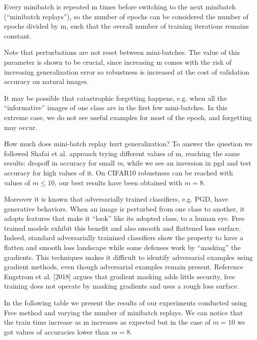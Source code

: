 \documentclass{article}
\begin{document}
Every minibatch is repeated m times before switching to the next minibatch (“minibatch replays”), so the number of epochs can be considered the number of epochs divided by m, such that the overall number of training iterations remains constant. 


Note that perturbations are not reset between mini-batches. The value of this parameter is shown to be crucial, since increasing m comes with the risk of increasing generalization error so robustness is increased at the cost of validation accuracy on natural images.

It may be possible that catastrophic forgetting happens, e.g. when all the “informative” images of one class are in the first few mini-batches. In this extreme case, we do not see useful examples for most of the epoch, and forgetting may occur.

 
How much does mini-batch replay hurt generalization?
To answer the question we followed Shafai et al. approach trying different values of m, reaching the same results: dropoff in accuracy for small \textit{m}, while we see an inversion in pgd and test accuracy for high values of it. On CIFAR10 robustness can be reached with values of $m \leq 10$, our best results have been obtained with $m=8$.
 
Moreover it is known that adversarially trained classifiers, e.g. PGD,  have generative behaviors. When an image is perturbed from one class to another, it adopts features that make it “look” like its adopted class, to a human eye.
Free trained models exhibit this benefit and also smooth and flattened loss surface.
Indeed, standard adversarially trainined classifiers show the property to have a flatten and smooth loss landscape while some defenses work by “masking” the gradients. This techniques makes it difficult to identify
adversarial examples using gradient methods, even though adversarial examples remain present.
Reference Engstrom et al. [2018] argues that gradient masking adds little security, free training does not operate by masking gradients and uses a rough loss surface.

In the following table we present the results of our experiments conducted using Free method and varying the number of minibatch replays. We can notice that the train time increase as m increases as expected but in the case of $m=10$ we got values of accuracies lower than $m=8$.
\end{document}
